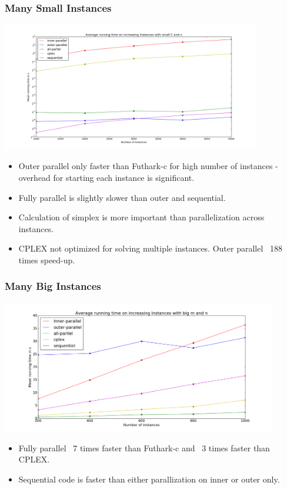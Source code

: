\documentclass[handout]{beamer}
\begin{document}
\begin{frame}[fragile]
\frametitle{Many Small Instances}
\centering
\includegraphics[width=0.85\textwidth]{../Doc/figures/many-small}
\begin{itemize}
	\item Outer parallel only faster than Futhark-c for high number of instances - overhead for starting each instance is significant.
	\item Fully parallel is slightly slower than outer and sequential. 
	\item Calculation of simplex is more important than parallelization across instances.
	\item CPLEX not optimized for solving multiple instances. Outer parallel ~188 times speed-up.
\end{itemize}
\end{frame}

\begin{frame}[fragile]
\frametitle{Many Big Instances}
\centering
\includegraphics[width=0.9\textwidth]{../Doc/figures/many-big}
\begin{itemize}
	\item Fully parallel ~7 times faster than Futhark-c and ~3 times faster than CPLEX.
	\item Sequential code is faster than either parallization on inner or outer only.
\end{itemize}
\end{frame}
\end{document}
